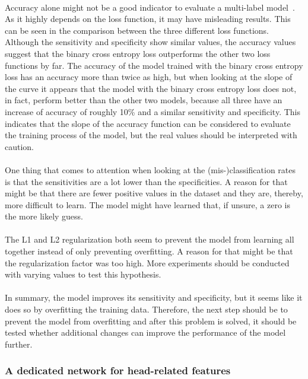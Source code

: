\\
Accuracy alone might not be a good indicator to evaluate a multi-label model~\citep{gibaja2015}. As it highly depends on the loss function, it may have misleading results. This can be seen in the comparison between the three different loss functions. Although the sensitivity and specificity show similar values, the accuracy values suggest that the binary cross entropy loss outperforms the other two loss functions by far. The accuracy of the model trained with the binary cross entropy loss has an accuracy more than twice as high, but when looking at the slope of the curve it appears that the model with the binary cross entropy loss does not, in fact, perform better than the other two models, because all three have an increase of accuracy of roughly 10\% and a similar sensitivity and specificity. This indicates that the slope of the accuracy function can be considered to evaluate the training process of the model, but the real values should be interpreted with caution. \\
\\
One thing that comes to attention when looking at the (mis-)classification rates is that the sensitivities are a lot lower than the specificities. A reason for that might be that there are fewer positive values in the dataset and they are, thereby, more difficult to learn. The model might have learned that, if unsure, a zero is the more likely guess. \\
\\
The L1 and L2 regularization both seem to prevent the model from learning all together instead of only preventing overfitting. A reason for that might be that the regularization factor was too high. More experiments should be conducted with varying values to test this hypothesis. \\
\\
In summary, the model improves its sensitivity and specificity, but it seems like it does so by overfitting the training data. Therefore, the next step should be to prevent the model from overfitting and after this problem is solved, it should be tested whether additional changes can improve the performance of the model further.


\subsubsection{A dedicated network for head-related features}
\label{subsec:HeadNetwork}

